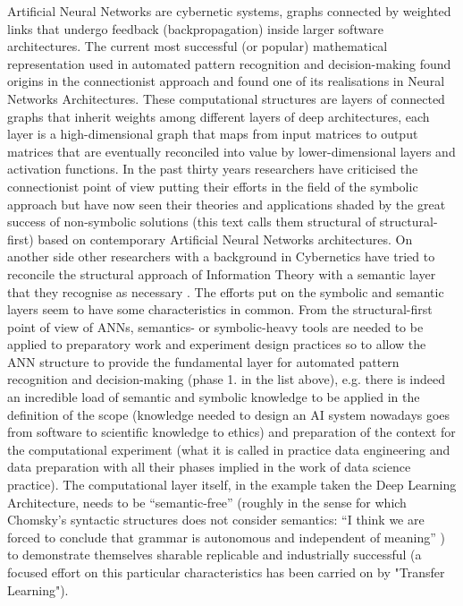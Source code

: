 \documentclass[14pt]{extarticle}
\begin{document}
\hspace*{15mm}Artificial Neural Networks are cybernetic systems, graphs connected by weighted links that undergo feedback (backpropagation) inside larger software architectures.
\newline
\hspace*{15mm}The current most successful (or popular) mathematical representation used in automated pattern recognition and decision-making found origins in the connectionist approach \cite{PlatoConnectionism} and found one of its realisations in Neural Networks Architectures. These computational structures are layers of connected graphs that inherit weights among different layers of deep architectures, each layer is a high-dimensional graph that maps from input matrices to output matrices that are eventually reconciled into value by lower-dimensional layers and activation functions.
\newline
\hspace*{15mm}In the past thirty years researchers have criticised the connectionist point of view putting their efforts in the field of the symbolic approach \cite{WIKIsymbolic,SUNsymconn} but have now seen their theories and applications shaded by the great success of non-symbolic solutions (this text calls them structural of structural-first) based on contemporary Artificial Neural Networks architectures. On another side other researchers with a background in Cybernetics have tried to reconcile the structural approach of Information Theory with a semantic layer that they recognise as necessary \cite{leydesdorff2021evolutionary}. The efforts put on the symbolic and semantic layers seem to have some characteristics in common.
\newline
From the structural-first point of view of ANNs, semantics- or symbolic-heavy tools are needed to be applied to preparatory work and experiment design practices so to allow the ANN structure to provide the fundamental layer for automated pattern recognition and decision-making (phase 1. in the list above), e.g. there is indeed an incredible load of semantic and symbolic knowledge to be applied in the definition of the scope (knowledge needed to design an AI system nowadays goes from software to scientific knowledge to ethics) and preparation of the context for the computational experiment (what it is called in practice data engineering and data preparation with all their phases implied in the work of data science practice). The computational layer itself, in the example taken the Deep Learning Architecture, needs to be “semantic-free” (roughly in the sense for which Chomsky’s syntactic structures does not consider semantics: “I think we are forced to conclude that grammar is autonomous and independent of meaning” \cite{chomsky2015syntactic}) to demonstrate themselves sharable replicable and industrially successful (a focused effort on this particular characteristics has been carried on by "Transfer Learning").
\end{document}
